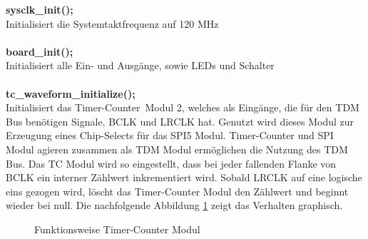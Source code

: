 \textbf{sysclk\_init();}\\
Initialisiert die Systemtaktfrequenz auf 120 MHz\\
\\
\textbf{board\_init();}\\
Initialisiert alle Ein- und Ausgänge, sowie LEDs und Schalter\\
\\
\textbf{tc\_waveform\_initialize();}\\
Initialisiert das \glqq Timer-Counter\grqq~Modul 2, welches als Eingänge, die für den TDM Bus benötigen Signale,  BCLK und LRCLK hat. Genutzt wird dieses Modul zur Erzeugung eines Chip-Selects für das SPI5 Modul. Timer-Counter und SPI Modul agieren zusammen als TDM Modul ermöglichen die Nutzung des TDM Bus.
\newpage
Das TC Modul wird so eingestellt, dass bei jeder fallenden Flanke von BCLK ein interner Zählwert inkrementiert wird. Sobald LRCLK auf eine logische eins gezogen wird, löscht das Timer-Counter Modul den Zählwert und beginnt wieder bei null. Die nachfolgende Abbildung \ref{fig:funktionsweise_tc} zeigt das Verhalten graphisch.

\begin{figure}[H]
	\centering
	\caption{Funktionsweise Timer-Counter Modul}
	\label{fig:funktionsweise_tc}
\end{figure}

